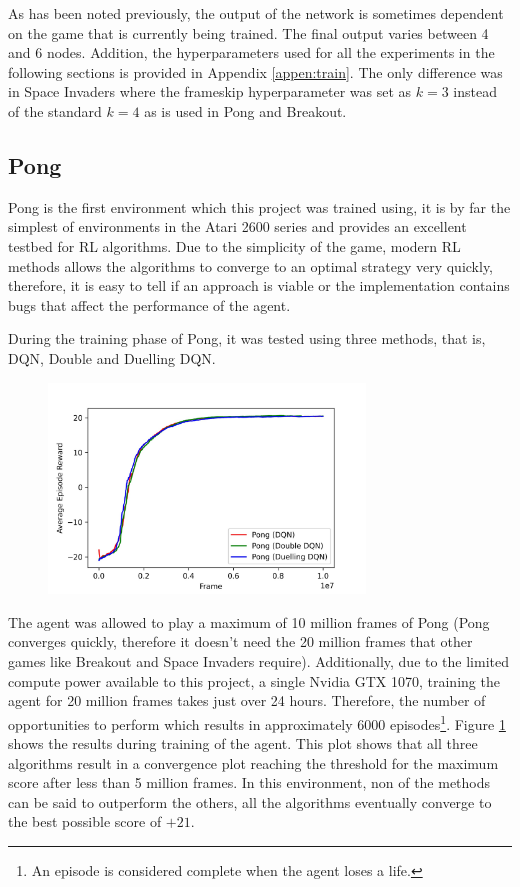 As has been noted previously, the output of the network is sometimes dependent on the game that is currently being trained. The final output varies between 4 and 6 nodes. Addition, the hyperparameters used for all the experiments in the following sections is provided in Appendix \ref{appen:train}. The only difference was in Space Invaders where the frameskip hyperparameter was set as $k = 3$ instead of the standard $k = 4$ as is used in Pong and Breakout.

\subsection{Pong}
Pong is the first environment which this project was trained using, it is by far the simplest of environments in the Atari 2600 series and provides an excellent testbed for RL algorithms. Due to the simplicity of the game, modern RL methods allows the algorithms to converge to an optimal strategy very quickly, therefore, it is easy to tell if an approach is viable or the implementation contains bugs that affect the performance of the agent.

During the training phase of Pong, it was tested using three methods, that is, DQN, Double and Duelling DQN.

\begin{figure}[htbp]
	\centering
	\includegraphics[width=0.75\textwidth]{chapters/chapter5/images/pong_plot.jpg}
	\caption[Pong Training results]{
		\label{fig:pong-train-results}
	}
\end{figure}

The agent was allowed to play a maximum of 10 million frames of Pong (Pong converges quickly, therefore it doesn't need the 20 million frames that other games like Breakout and Space Invaders require). Additionally, due to the limited compute power available to this project, a single Nvidia GTX 1070, training the agent for 20 million frames takes just over 24 hours. Therefore, the number of opportunities to perform  which results in approximately 6000 episodes\footnote{An episode is considered complete when the agent loses a life.}. Figure \ref{fig:pong-train-results} shows the results during training of the agent. This plot shows that all three algorithms result in a convergence plot reaching the threshold for the maximum score after less than 5 million frames. In this environment, non of the methods can be said to outperform the others, all the algorithms eventually converge to the best possible score of $+21$.

